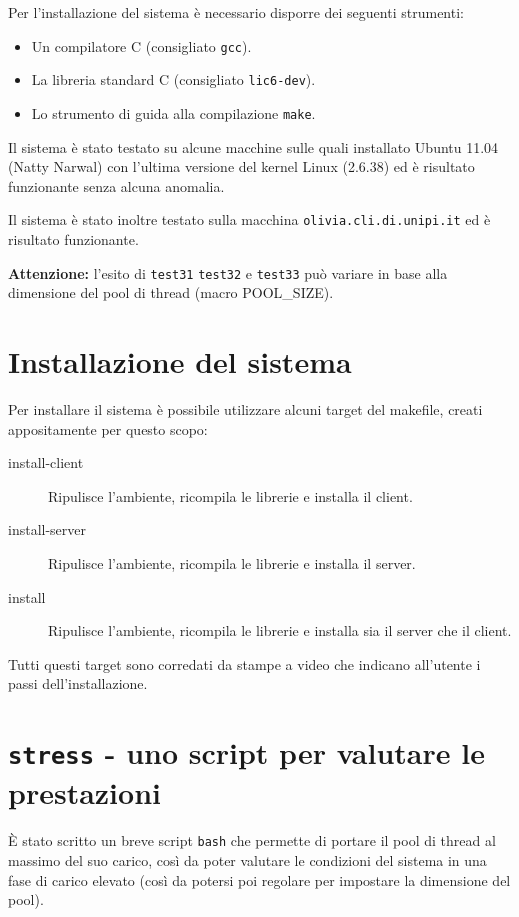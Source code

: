\documentclass[a4paper,10pt]{article}
\begin{document}
Per l'installazione del sistema \`e necessario disporre dei seguenti strumenti:
\begin{itemize}
	\item Un compilatore C (consigliato \texttt{gcc}).
	\item La libreria standard C (consigliato \texttt{lic6-dev}).
	\item Lo strumento di guida alla compilazione \texttt{make}.
\end{itemize}

Il sistema \`e stato testato su alcune macchine sulle quali  installato Ubuntu 11.04 (Natty Narwal) con l'ultima versione del kernel Linux (2.6.38) ed \`e risultato funzionante senza alcuna anomalia.

Il sistema \`e stato inoltre testato sulla macchina \texttt{olivia.cli.di.unipi.it} ed \`e risultato funzionante.

\textbf{Attenzione:} l'esito di \texttt{test31} \texttt{test32} e \texttt{test33} pu\`o variare in base alla dimensione del pool di thread (macro POOL\_SIZE).

\section{Installazione del sistema}

Per installare il sistema \`e possibile utilizzare alcuni target del makefile, creati appositamente per questo scopo:

\begin{description}
	\item[install-client] Ripulisce l'ambiente, ricompila le librerie e installa il client.
	\item[install-server] Ripulisce l'ambiente, ricompila le librerie e installa il server.
	\item[install] Ripulisce l'ambiente, ricompila le librerie e installa sia il server che il client.
\end{description}

Tutti questi target sono corredati da stampe a video che indicano all'utente i passi dell'installazione.

\section{\texttt{stress} - uno script per valutare le prestazioni}

\`E stato scritto un breve script \texttt{bash} che permette di portare il pool di thread al massimo del suo carico, cos\`i da poter valutare le condizioni del sistema in una fase di carico elevato (cos\`i da potersi poi regolare per impostare la dimensione del pool).
\end{document}
